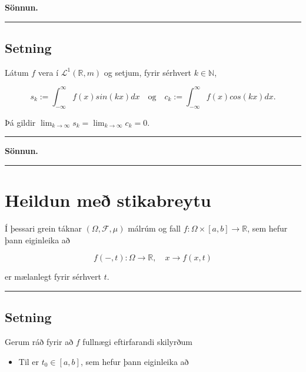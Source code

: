 \documentclass[]{book}
\providecommand{\tightlist}{%
  \setlength{\itemsep}{0pt}\setlength{\parskip}{0pt}}
\begin{document}
\textbf{Sönnun.}

\begin{center}\rule{0.5\linewidth}{\linethickness}\end{center}

\hypertarget{setning-58}{%
\section{Setning}\label{setning-58}}

Látum \(f\) vera í \(\mathcal L^1(\mathbb R,m)\) og setjum, fyrir sérhvert \(k\in\mathbb N\),

\[
s_k:=\int_{-\infty}^\infty f(x) sin(kx)dx \quad \text{og} \quad c_k:=\int_{-\infty}^\infty f(x)cos(kx)dx.
\]

Þá gildir \(\lim_{k\rightarrow\infty}s_k = \lim_{k\rightarrow\infty}c_k=0\).

\begin{center}\rule{0.5\linewidth}{\linethickness}\end{center}

\textbf{Sönnun.}

\begin{center}\rule{0.5\linewidth}{\linethickness}\end{center}

\hypertarget{heildun-me-stikabreytu}{%
\chapter{Heildun með stikabreytu}\label{heildun-me-stikabreytu}}

Í þessari grein táknar \((\Omega, \mathcal F, \mu)\) málrúm og fall \(f:\Omega\times[a,b]\rightarrow\mathbb R\), sem hefur þann eiginleika að

\[
f(-,t):\Omega\rightarrow\mathbb R,\quad x\rightarrow f(x,t)
\]

er mælanlegt fyrir sérhvert \(t\).

\begin{center}\rule{0.5\linewidth}{\linethickness}\end{center}

\hypertarget{setning-59}{%
\section{Setning}\label{setning-59}}

Gerum ráð fyrir að \(f\) fullnægi eftirfarandi skilyrðum

\begin{itemize}
\tightlist
\item
  Til er \(t_0\in[a,b]\), sem hefur þann eiginleika að
\end{itemize}
\end{document}
